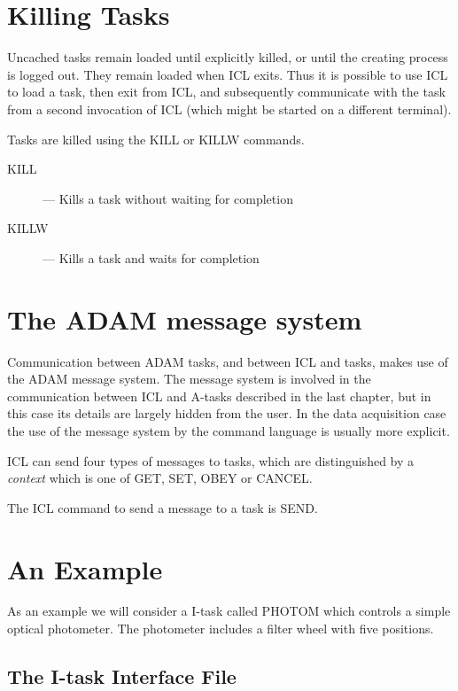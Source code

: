 \section{Killing Tasks}

Uncached tasks remain loaded until explicitly killed, or until the creating
process is logged out. They remain loaded when ICL exits. Thus it is possible
to use ICL to load a task, then exit from ICL, and subsequently communicate
with the task from a second invocation of ICL (which might be started on
a different terminal).

Tasks are killed using the KILL or KILLW commands.

\begin{description}

\item[KILL] --- Kills a task without waiting for completion

\item[KILLW] --- Kills a task and waits for completion                    
                                                     
\end{description}

\section{The ADAM message system}

Communication between ADAM tasks, and between ICL and tasks, makes use of
the ADAM message system. The message system is involved in the communication
between ICL and A-tasks described in the last chapter, but in this case
its details are largely hidden from the user. In the data acquisition case
the use of the message system by the command language is usually more explicit.

ICL can send four types of messages to tasks, which are distinguished by
a {\em context} which is one of GET, SET, OBEY or CANCEL. 

The ICL command to send a message to a task is SEND.

\section{An Example}

As an example we will consider a I-task called PHOTOM which controls a simple
optical photometer. The photometer includes a filter wheel with five positions.

\subsection{The I-task Interface File}

